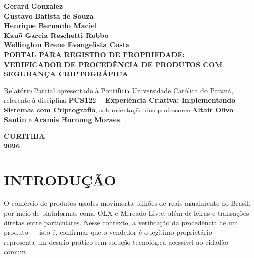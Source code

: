 \documentclass[12pt,a4paper]{article}
\begin{document}
\thispagestyle{empty}
\begin{center}
  \textbf{Gerard Gonzalez \\ Gustavo Batista de Souza \\ Henrique Bernardo Maciel \\
  Kauã Garcia Reschetti Rubbo \\ Wellington Breno Evangelista Costa} \\
  \vspace{2cm}
  \textbf{PORTAL PARA REGISTRO DE PROPRIEDADE: \\
  VERIFICADOR DE PROCEDÊNCIA DE PRODUTOS COM SEGURANÇA CRIPTOGRÁFICA}
\end{center}
\vspace{3cm}
\begin{flushright}
  \begin{minipage}{0.55\textwidth}
    \small
    Relatório Parcial apresentado à Pontifícia Universidade
    Católica do Paraná, referente à disciplina
    \textbf{PCS122 -- Experiência Criativa: Implementando
    Sistemas com Criptografia}, sob orientação dos professores
    \textbf{Altair Olivo Santin} e \textbf{Aramis Hornung Moraes}.
  \end{minipage}
\end{flushright}
\vspace{\fill}
\begin{center}
  \textbf{CURITIBA} \\
  \textbf{2026}
\end{center}
\newpage

\tableofcontents
\newpage

\setcounter{section}{0}
\section{INTRODUÇÃO}

O comércio de produtos usados movimenta bilhões de reais anualmente no Brasil, por meio de plataformas como OLX e Mercado Livre, além de feiras e transações diretas entre particulares. Nesse contexto, a verificação da procedência de um produto — isto é, confirmar que o vendedor é o legítimo proprietário — representa um desafio prático sem solução tecnológica acessível ao cidadão comum.
\end{document}
